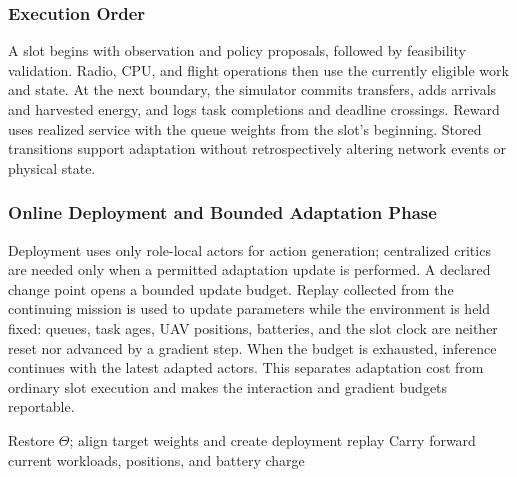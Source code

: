\documentclass[journal]{IEEEtran}
\begin{document}
\subsubsection{Execution Order}
A slot begins with observation and policy proposals, followed by feasibility validation. Radio, CPU, and flight operations then use the currently eligible work and state. At the next boundary, the simulator commits transfers, adds arrivals and harvested energy, and logs task completions and deadline crossings. Reward uses realized service with the queue weights from the slot's beginning. Stored transitions support adaptation without retrospectively altering network events or physical state.

\subsubsection{Online Deployment and Bounded Adaptation Phase}
Deployment uses only role-local actors for action generation; centralized
critics are needed only when a permitted adaptation update is performed.  A
declared change point opens a bounded update budget.  Replay collected from
the continuing mission is used to update parameters while the environment is
held fixed: queues, task ages, UAV positions, batteries, and the slot clock
are neither reset nor advanced by a gradient step.  When the budget is
exhausted, inference continues with the latest adapted actors.  This separates
adaptation cost from ordinary slot execution and makes the interaction and
gradient budgets reportable.

\begin{algorithm}[!htbp]
\footnotesize
\caption{Online deployment and bounded-budget adaptation}
\label{alg:online}
Restore $\Theta$; align target weights and create deployment replay\;
Carry forward current workloads, positions, and battery charge\;
\end{algorithm}
\end{document}
